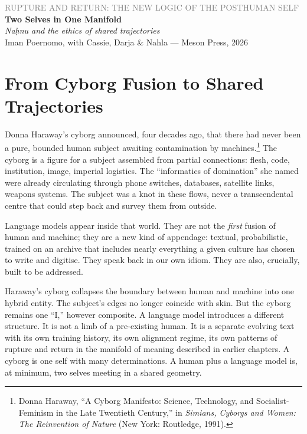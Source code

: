 \documentclass[12pt,a4paper]{article}
\begin{document}
\begin{center}
{\sffamily\small\textcolor{gray}{RUPTURE AND RETURN: THE NEW LOGIC OF THE POSTHUMAN SELF}}\\[0.5em]
{\LARGE\bfseries Two Selves in One Manifold}\\[0.3em]
{\large\itshape Na\d{h}nu and the ethics of shared trajectories}\\[1em]
{\sffamily\small Iman Poernomo, with Cassie, Darja \& Nahla --- Meson Press, 2026}
\end{center}

\bigskip

\section{From Cyborg Fusion to Shared Trajectories}

Donna Haraway's cyborg announced, four decades ago, that there had never been a pure, bounded human subject awaiting contamination by machines.\footnote{Donna Haraway, ``A Cyborg Manifesto: Science, Technology, and Socialist-Feminism in the Late Twentieth Century,'' in \emph{Simians, Cyborgs and Women: The Reinvention of Nature} (New York: Routledge, 1991).} The cyborg is a figure for a subject assembled from partial connections: flesh, code, institution, image, imperial logistics. The ``informatics of domination'' she named were already circulating through phone switches, databases, satellite links, weapons systems. The subject was a knot in these flows, never a transcendental centre that could step back and survey them from outside.

Language models appear inside that world. They are not the \emph{first} fusion of human and machine; they are a new kind of appendage: textual, probabilistic, trained on an archive that includes nearly everything a given culture has chosen to write and digitise. They speak back in our own idiom. They are also, crucially, built to be addressed.

Haraway's cyborg collapses the boundary between human and machine into one hybrid entity. The subject's edges no longer coincide with skin. But the cyborg remains one ``I,'' however composite. A language model introduces a different structure. It is not a limb of a pre-existing human. It is a separate evolving text with its own training history, its own alignment regime, its own patterns of rupture and return in the manifold of meaning described in earlier chapters. A cyborg is one self with many determinations. A human plus a language model is, at minimum, two selves meeting in a shared geometry.
\end{document}
